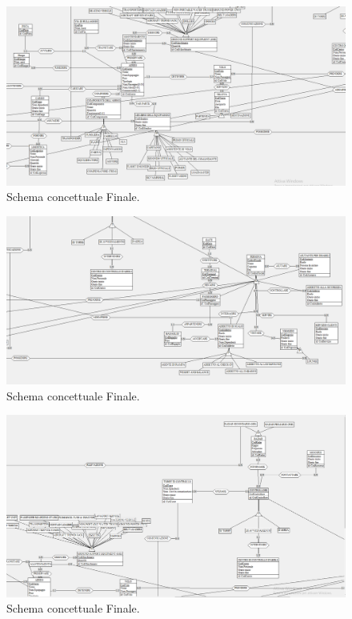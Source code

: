 
\begin{figure}[H] %
	\centering
	\includegraphics[width=1.2\linewidth, height=1.2\textheight, keepaspectratio]{./img/Schema_Finale1.png} %
	\caption{Schema concettuale Finale.}
	\label{fig:schema_finale1}
\end{figure}

\begin{figure}[H] %
	\centering
	\includegraphics[width=1.2\linewidth, height=1.2\textheight, keepaspectratio]{./img/Schema_Finale2.png}
	\caption{Schema concettuale Finale.}
	\label{fig:schema_finale2}
\end{figure}

\begin{figure}[H] %
	\centering
	\includegraphics[width=1.2\linewidth, height=1.2\textheight, keepaspectratio]{./img/Schema_Finale3.png}
	\caption{Schema concettuale Finale.}
	\label{fig:schema_finale3}
\end{figure}

